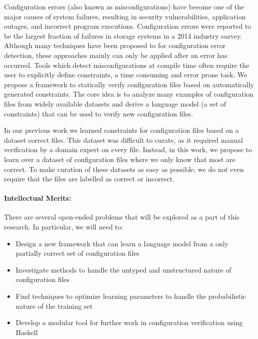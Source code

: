 Configuration errors (also known as misconfigurations) have become one of the major causes of system failures, resulting in security vulnerabilities, application outages, and incorrect program executions. 
Configuration errors were reported to be the largest fraction of failures in storage systems in a 2014 industry survey. 
Although many techniques have been proposed to for configuration error detection, these approaches mainly can only be applied after an error has occurred.
Tools which detect misconfigurations at compile time often require the user to explicitly define constraints, a time consuming and error prone task.
We propose a framework to statically verify configuration files based on automatically generated constraints.
The core idea is to analyze many examples of configuration files from widely available datasets and derive a language model (a set of constraints) that can be used to verify new configuration files.

In our previous work we learned constraints for configuration files based on a dataset correct files.
This dataset was difficult to curate, as it required manual verification by a domain expert on every file.
Instead, in this work, we propose to learn over a dataset of configuration files where we only know that most are correct.
To make curation of these datasets as easy as possible, we do not even require that the files are labelled as correct or incorrect.


\paragraph{Intellectual Merits:} There are several open-ended problems that will be explored as a part of this research. In particular, we will need to:

\begin{itemize}
\item Design a new framework that can learn a language model from a only partially correct set of configuration files
\item Investigate methods to handle the untyped and unstructured nature of configuration files
\item Find techniques to optimize learning parameters to handle the probabilistic nature of the training set
\item Develop a modular tool for further work in configuration verification using Haskell
\end{itemize}

